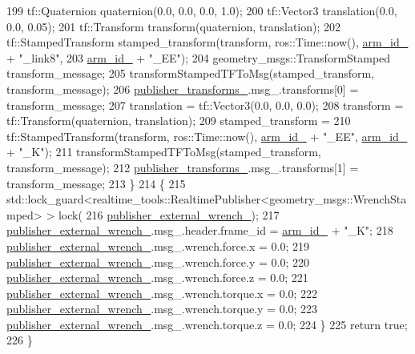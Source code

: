 \begin{DoxyCode}
199     tf::Quaternion quaternion(0.0, 0.0, 0.0, 1.0);
200     tf::Vector3 translation(0.0, 0.0, 0.05);
201     tf::Transform transform(quaternion, translation);
202     tf::StampedTransform stamped\_transform(transform, ros::Time::now(), \hyperlink{classfranka__control_1_1FrankaStateController_a603d865facc13c7b1f2ebb5a27404221}{arm\_id\_} + \textcolor{stringliteral}{"\_link8"},
203                                            \hyperlink{classfranka__control_1_1FrankaStateController_a603d865facc13c7b1f2ebb5a27404221}{arm\_id\_} + \textcolor{stringliteral}{"\_EE"});
204     geometry\_msgs::TransformStamped transform\_message;
205     transformStampedTFToMsg(stamped\_transform, transform\_message);
206     \hyperlink{classfranka__control_1_1FrankaStateController_a3466cae3276a7576686661ecbe05a649}{publisher\_transforms\_}.msg\_.transforms[0] = transform\_message;
207     translation = tf::Vector3(0.0, 0.0, 0.0);
208     transform = tf::Transform(quaternion, translation);
209     stamped\_transform =
210         tf::StampedTransform(transform, ros::Time::now(), \hyperlink{classfranka__control_1_1FrankaStateController_a603d865facc13c7b1f2ebb5a27404221}{arm\_id\_} + \textcolor{stringliteral}{"\_EE"}, 
      \hyperlink{classfranka__control_1_1FrankaStateController_a603d865facc13c7b1f2ebb5a27404221}{arm\_id\_} + \textcolor{stringliteral}{"\_K"});
211     transformStampedTFToMsg(stamped\_transform, transform\_message);
212     \hyperlink{classfranka__control_1_1FrankaStateController_a3466cae3276a7576686661ecbe05a649}{publisher\_transforms\_}.msg\_.transforms[1] = transform\_message;
213   \}
214   \{
215     std::lock\_guard<realtime\_tools::RealtimePublisher<geometry\_msgs::WrenchStamped> > lock(
216         \hyperlink{classfranka__control_1_1FrankaStateController_aeff7a641817b5261934421fcbd1205f5}{publisher\_external\_wrench\_});
217     \hyperlink{classfranka__control_1_1FrankaStateController_aeff7a641817b5261934421fcbd1205f5}{publisher\_external\_wrench\_}.msg\_.header.frame\_id = 
      \hyperlink{classfranka__control_1_1FrankaStateController_a603d865facc13c7b1f2ebb5a27404221}{arm\_id\_} + \textcolor{stringliteral}{"\_K"};
218     \hyperlink{classfranka__control_1_1FrankaStateController_aeff7a641817b5261934421fcbd1205f5}{publisher\_external\_wrench\_}.msg\_.wrench.force.x = 0.0;
219     \hyperlink{classfranka__control_1_1FrankaStateController_aeff7a641817b5261934421fcbd1205f5}{publisher\_external\_wrench\_}.msg\_.wrench.force.y = 0.0;
220     \hyperlink{classfranka__control_1_1FrankaStateController_aeff7a641817b5261934421fcbd1205f5}{publisher\_external\_wrench\_}.msg\_.wrench.force.z = 0.0;
221     \hyperlink{classfranka__control_1_1FrankaStateController_aeff7a641817b5261934421fcbd1205f5}{publisher\_external\_wrench\_}.msg\_.wrench.torque.x = 0.0;
222     \hyperlink{classfranka__control_1_1FrankaStateController_aeff7a641817b5261934421fcbd1205f5}{publisher\_external\_wrench\_}.msg\_.wrench.torque.y = 0.0;
223     \hyperlink{classfranka__control_1_1FrankaStateController_aeff7a641817b5261934421fcbd1205f5}{publisher\_external\_wrench\_}.msg\_.wrench.torque.z = 0.0;
224   \}
225   \textcolor{keywordflow}{return} \textcolor{keyword}{true};
226 \}
\end{DoxyCode}

